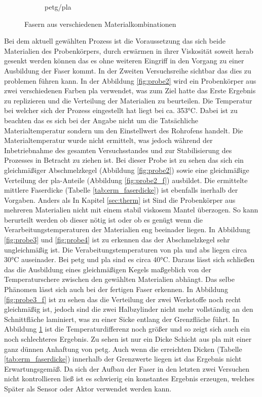 \begin{figure}[!h]
\begin{subfigure}[]{.29\textwidth}
         \caption{\acs{petg}/\acs{pla} }
        \label{fig:probe4_f}
     \end{subfigure}
     \caption{Fasern aus verschiedenen Materialkombinationen}
      \label{fig:probenkoerper_vor}
        \end{figure}
    

Bei dem aktuell gewählten Prozess ist die Voraussetzung das sich beide Materialien des Probenkörpers, durch  erwärmen in ihrer Viskosität soweit herab gesenkt werden können das es ohne weiteren Eingriff in den Vorgang zu einer Ausbildung der Faser kommt. In der Zweiten Versuchsreihe sichtbar das dies zu problemen führen kann. In der Abbildung \ref{fig:probe2} wird ein Probenkörper aus zwei verschiedenen Farben \acs{pla} verwendet, was zum Ziel hatte das Erste Ergebnis zu replizieren und die Verteilung der Materialien zu beurteilen. Die Temperatur bei welcher sich der Prozess eingestellt hat liegt bei ca. 353°C. Dabei ist zu beachten das es sich bei der Angabe nicht um die Tatsächliche Materialtemperatur sondern um den Einstellwert des Rohrofens handelt. Die Materialtemperatur wurde nicht ermittelt, was jedoch während der Inbetriebnahme des gesamten Versuchsstandes und zur Stabilisierung des Prozesses in Betracht zu ziehen ist. Bei dieser Probe ist zu sehen das sich ein gleichmäßiger Abschmelzkegel (Abbildung \ref{fig:probe2}) sowie eine gleichmäßige Verteilung der \acs{pla}-Anteile (Abbildung \ref{fig:probe2_f}) ausbildet. Die ermittelte mittlere Faserdicke (Tabelle \ref{tab:erm_faserdicke}) ist ebenfalls inerhalb der Vorgaben. Anders als In Kapitel \ref{sec:therm} ist Sind die Probenkörper aus mehreren Materialien nicht mit einem stabil viskosem Mantel überzogen. So kann berurteilt werden ob dieser nötig ist oder ob es genügt wenn die Verarbeitungstemperaturen der Materialien eng beeinader liegen. In Abbildung \ref{fig:probe3} und \ref{fig:probe4} ist zu erkennen das der Abschmelzkegel sehr ungleichmäßig ist. Die Verabeitungstemperaturen von \acs{pla} und \acs{abs} liegen circa 30°C auseinader. Bei \acs{petg} und \acs{pla} sind es circa 40°C. Daraus lässt sich schließen das die Ausbildung eines gleichmäßigen Kegels maßgeblich von der Temperaturschere zwischen den gewählten Materialien abhängt. Das selbe Phänomen lässt sich auch bei der fertigen Faser erkennen. In Abbildung \ref{fig:probe3_f} ist zu sehen das die Verteilung der zwei Werkstoffe noch recht gleichmäßig ist, jedoch sind die zwei Halbzylinder nicht mehr vollständig an den Schnittfläche laminiert, was zu einer Sicke entlang der Grenzfläche führt. In Abbildung \ref{fig:probe4_f} ist die Temperaturdifferenz noch größer und so zeigt sich auch ein noch schlechteres Ergebnis. Zu sehen ist nur ein Dicke Schicht aus \ac{pla} mit einer ganz dünnen Anhaftung von \acs{petg}. Auch wenn die erreichten Dicken (Tabelle \ref{tab:erm_faserdicke}) innerhalb der Grenzwerte liegen ist das Ergebnis nicht Erwartungsgemäß. Da sich der Aufbau der Faser in den letzten zwei Versuchen nicht kontrollieren ließ ist es schwierig ein konstantes Ergebnis erzeugen, welches Später als Sensor oder Aktor verwendet werden kann.

